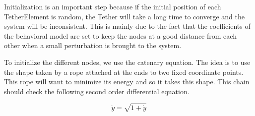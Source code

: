 Initialization is an important step because if the initial position of each TetherElement is random, the Tether will take a long time to converge and the system will be inconsistent. This is mainly due to the fact that the coefficients of the behavioral model are set to keep the nodes at a good distance from each other when a small perturbation is brought to the system.

To initialize the different nodes, we use the catenary equation. The idea is to use the shape taken by a rope attached at the ends to two fixed coordinate points. This rope will want to minimize its energy and so it takes this shape. This chain should check the following second order differential equation.

$$\ddot y = \sqrt{1 + \dot y}$$